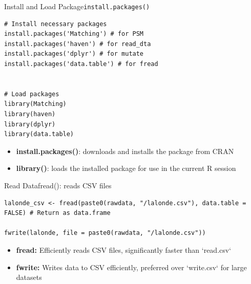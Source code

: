 \documentclass[hyperref={pdfpagelabels=false}]{beamer}
\begin{document}
\begin{frame}[fragile]{Install and Load Package}{\texttt{install.packages()}}
\begin{lstlisting}
# Install necessary packages
install.packages('Matching') # for PSM
install.packages('haven') # for read_dta
install.packages('dplyr') # for mutate 
install.packages('data.table') # for fread


# Load packages
library(Matching) 
library(haven)
library(dplyr)
library(data.table)
\end{lstlisting}
	\begin{itemize}
		\vspace{0.2cm}
	
			\item \textbf{install.packages()}: downloads and installs the package from CRAN
			\vspace{0.2cm}
			\item \textbf{library()}: loads the installed package for use in the current R session
		\end{itemize}

\end{frame}



\begin{frame}[fragile]{Read Data}{fread(): reads CSV files}
\begin{lstlisting}
lalonde_csv <- fread(paste0(rawdata, "/lalonde.csv"), data.table = FALSE) # Return as data.frame

fwrite(lalonde, file = paste0(rawdata, "/lalonde.csv"))
\end{lstlisting}
	
	\begin{itemize}
		\vspace{0.2cm}
		\item \textbf{fread:} Efficiently reads CSV files, significantly faster than `read.csv`
		\vspace{0.2cm}
		\item \textbf{fwrite:} Writes data to CSV efficiently, preferred over `write.csv` for large datasets
	\end{itemize}
\end{frame}
\end{document}
